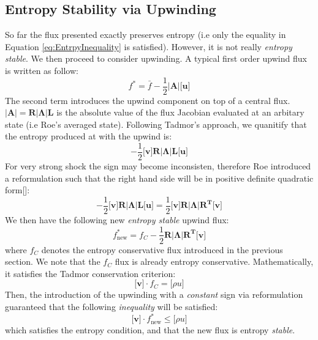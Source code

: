 \documentclass[a4paper]{article}
\numberwithin{equation}{section}
\begin{document}
\subsection{Entropy Stability via Upwinding}
So far the flux presented exactly preserves entropy (i.e only the equality in Equation \ref{eq:EntrpyInequality} is satisfied). However, it is not really \textit{entropy stable}. We then proceed to consider upwinding. A typical first order upwind flux is written as follow:
\begin{equation} \label{eq:oldFlux}
    f^* = \bar{f} - \frac{1}{2}\left|\mathbf{A} \right| \big[\mathbf{u}\big]
\end{equation}
The second term introduces the upwind component on top of a central flux. $\left|\mathbf{A}\right| = \mathbf{R \left|\Lambda \right| L }$ is the absolute value of the flux Jacobian evaluated at an arbitary state (i.e Roe's averaged state). Following Tadmor's approach, we quanitify that the entropy produced at with the upwind is:
\begin{equation}
    -\frac{1}{2} \big[\mathbf{v}\big] \mathbf{R \left|\Lambda \right| L } \big[\mathbf{u}\big]
\end{equation}
For very strong shock the sign may become inconsisten, therefore Roe introduced a reformulation such that the right hand side will be in positive definite quadratic form[]:
\begin{equation}
    -\frac{1}{2} \big[\mathbf{v}\big] \mathbf{R \left|\Lambda \right| L } \big[\mathbf{u}\big] = \frac{1}{2}\big[\mathbf{v}\big] \mathbf{R \left|\Lambda \right| R^T } \big[\mathbf{v}\big]
\end{equation}
We then have the following new \textit{entropy stable} upwind flux:
\begin{equation} \label{eq:newFlux}
    f^*_{\text{new}} = f_C - \frac{1}{2} \mathbf{R \left|\Lambda \right| R^T } \big[\mathbf{v}\big]
\end{equation}
where $f_C$ denotes the entropy conservative flux introduced in the previous section. We note that the $f_C$ flux is already entropy conservative. Mathematically, it satisfies the Tadmor conservation criterion: 
\begin{equation}
    \big[\mathbf{v}\big]\cdot f_C = \big[\rho u\big]
\end{equation}
Then, the introduction of the upwinding with a \textit{constant} sign via reformulation guaranteed that the following \textit{inequality} will be satisfied:
\begin{equation}
    \big[\mathbf{v}\big] \cdot f^*_{\text{new}} \leq \big[\rho u\big]
\end{equation}
which satisfies the entropy condition, and that the new flux is entropy \textit{stable}. 
\end{document}
